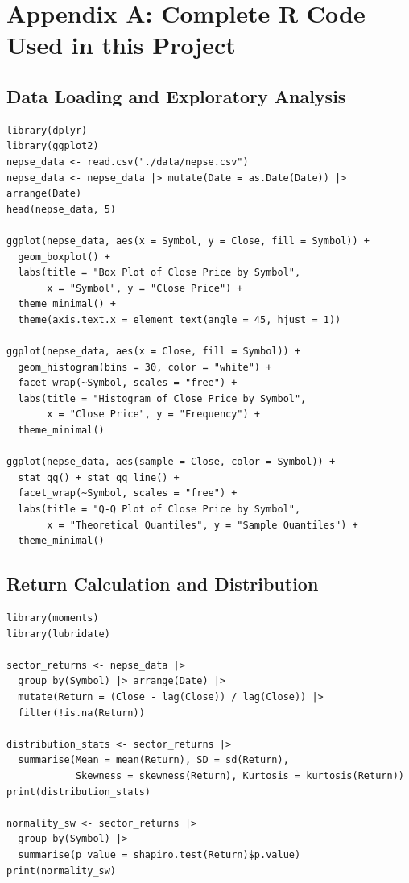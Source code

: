 \documentclass[12pt,a4paper,fleqn]{article}
\begin{document}
\appendix
\section*{Appendix A: Complete R Code Used in this Project}

\subsection*{Data Loading and Exploratory Analysis}
\begin{tcolorbox}[colback=gray!5, colframe=black!70, fontupper=\small, breakable, title=R Code]
\begin{verbatim}
library(dplyr)
library(ggplot2)
nepse_data <- read.csv("./data/nepse.csv")
nepse_data <- nepse_data |> mutate(Date = as.Date(Date)) |> arrange(Date)
head(nepse_data, 5)

ggplot(nepse_data, aes(x = Symbol, y = Close, fill = Symbol)) +
  geom_boxplot() +
  labs(title = "Box Plot of Close Price by Symbol", 
       x = "Symbol", y = "Close Price") +
  theme_minimal() + 
  theme(axis.text.x = element_text(angle = 45, hjust = 1))

ggplot(nepse_data, aes(x = Close, fill = Symbol)) +
  geom_histogram(bins = 30, color = "white") +
  facet_wrap(~Symbol, scales = "free") +
  labs(title = "Histogram of Close Price by Symbol",
       x = "Close Price", y = "Frequency") +
  theme_minimal()

ggplot(nepse_data, aes(sample = Close, color = Symbol)) +
  stat_qq() + stat_qq_line() +
  facet_wrap(~Symbol, scales = "free") +
  labs(title = "Q-Q Plot of Close Price by Symbol",
       x = "Theoretical Quantiles", y = "Sample Quantiles") +
  theme_minimal()
\end{verbatim}
\end{tcolorbox}

\subsection*{Return Calculation and Distribution}
\begin{tcolorbox}[colback=gray!5, colframe=black!70, fontupper=\small, breakable, title=R Code]
\begin{verbatim}
library(moments)
library(lubridate)

sector_returns <- nepse_data |>
  group_by(Symbol) |> arrange(Date) |>
  mutate(Return = (Close - lag(Close)) / lag(Close)) |>
  filter(!is.na(Return))

distribution_stats <- sector_returns |>
  summarise(Mean = mean(Return), SD = sd(Return),
            Skewness = skewness(Return), Kurtosis = kurtosis(Return))
print(distribution_stats)

normality_sw <- sector_returns |>
  group_by(Symbol) |>
  summarise(p_value = shapiro.test(Return)$p.value)
print(normality_sw)
\end{verbatim}
\end{tcolorbox}
\end{document}
